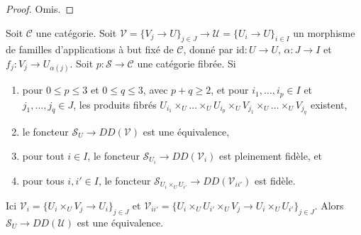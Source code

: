 \begin{proof}
Omis.
\end{proof}

\begin{lemma}
\label{lemma-compare-descent-condition}
Soit $\mathcal{C}$ une catégorie. Soit
$\mathcal{V} = \{V_j \to U\}_{j \in J} \to
\mathcal{U} = \{U_i \to U\}_{i \in I}$
un morphisme de familles d'applications à but fixé de $\mathcal{C}$, donné par
$\text{id} : U \to U$, $\alpha : J \to I$ et
$f_j : V_j \to U_{\alpha(j)}$. Soit
$p : \mathcal{S} \to \mathcal{C}$ une catégorie fibrée. Si
\begin{enumerate}
\item pour $0 \leq p \leq 3$ et $0 \leq q \leq 3$, avec $p + q \geq 2$,
et pour $i_1, \ldots, i_p \in I$ et $j_1, \ldots, j_q \in J$,
les produits fibrés $U_{i_1} \times_U \ldots \times_U U_{i_p} \times_U
V_{j_1} \times_U \ldots \times_U V_{j_q}$ existent,
\item le foncteur $\mathcal{S}_U \to DD(\mathcal{V})$
est une équivalence,
\item pour tout $i \in I$, le foncteur
$\mathcal{S}_{U_i} \to DD(\mathcal{V}_i)$
est pleinement fidèle, et
\item pour tous $i, i' \in I$, le foncteur
$\mathcal{S}_{U_i \times_U U_{i'}} \to DD(\mathcal{V}_{ii'})$
est fidèle.
\end{enumerate}
Ici $\mathcal{V}_i = \{U_i \times_U V_j \to U_i\}_{j \in J}$ et
$\mathcal{V}_{ii'} =
\{U_i \times_U U_{i'} \times_U V_j \to U_i \times_U U_{i'}\}_{j \in J}$.
Alors $\mathcal{S}_U \to DD(\mathcal{U})$ est une équivalence.
\end{lemma}

